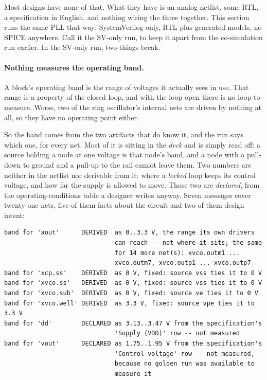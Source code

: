 \documentclass[11pt,a4paper]{article}
\begin{document}
Most designs have none of that. What they have is an analog netlist,
some RTL, a specification in English, and nothing wiring the three
together. This section runs the same PLL that way: SystemVerilog only,
RTL plus generated models, no SPICE anywhere. Call it the SV-only run,
to keep it apart from the co-simulation run earlier. In the SV-only
run, two things break.

\paragraph{Nothing measures the operating band.} A block's operating
band is the range of voltages it actually sees in use. That range is a
property of the closed loop, and with the loop open there is no loop
to measure. Worse, two of the ring oscillator's internal nets are
driven by nothing at all, so they have no operating point either.

So the band comes from the two artifacts that do know it, and the run
says which one, for every net. Most of it is sitting in the
\emph{deck} and is simply read off: a source holding a node at one
voltage is that node's band, and a node with a pull-down to ground and
a pull-up to the rail cannot leave them. Two numbers are neither in
the netlist nor derivable from it: where a \emph{locked} loop keeps
its control voltage, and how far the supply is allowed to move. Those
two are \emph{declared}, from the operating-conditions table a
designer writes anyway. Seven messages cover twenty-one nets, five of
them facts about the circuit and two of them design intent:

\begin{lstlisting}
band for 'aout'      DERIVED  as 0..3.3 V, the range its own drivers
                              can reach -- not where it sits; the same
                              for 14 more net(s): xvco.outm1 ...
                              xvco.outm7, xvco.outp1 ... xvco.outp7
band for 'xcp.ss'    DERIVED  as 0 V, fixed: source vss ties it to 0 V
band for 'xvco.ss'   DERIVED  as 0 V, fixed: source vss ties it to 0 V
band for 'xvco.sub'  DERIVED  as 0 V, fixed: source ve ties it to 0 V
band for 'xvco.well' DERIVED  as 3.3 V, fixed: source vpe ties it to 3.3 V
band for 'dd'        DECLARED as 3.13..3.47 V from the specification's
                              'Supply (VDD)' row -- not measured
band for 'vout'      DECLARED as 1.75..1.95 V from the specification's
                              'Control voltage' row -- not measured,
                              because no golden run was available to
                              measure it
\end{lstlisting}
\end{document}

